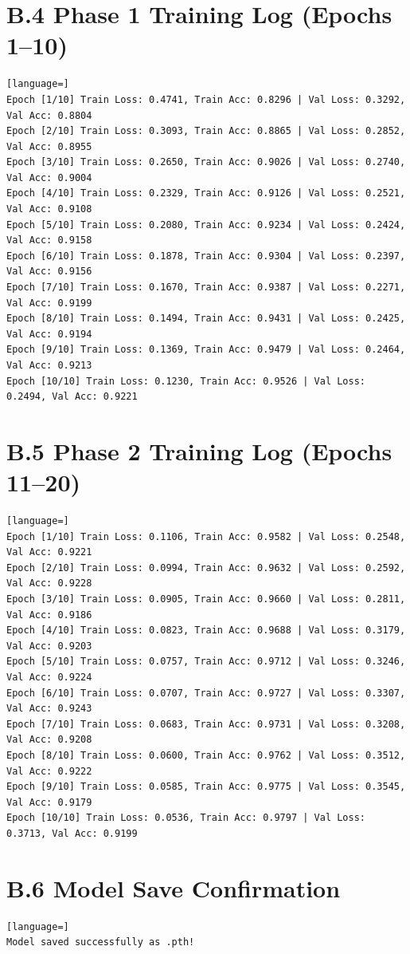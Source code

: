 \documentclass[12pt,a4paper]{report}
\begin{document}
\section*{B.4 Phase 1 Training Log (Epochs 1--10)}
\begin{lstlisting}[language=]
Epoch [1/10] Train Loss: 0.4741, Train Acc: 0.8296 | Val Loss: 0.3292, Val Acc: 0.8804
Epoch [2/10] Train Loss: 0.3093, Train Acc: 0.8865 | Val Loss: 0.2852, Val Acc: 0.8955
Epoch [3/10] Train Loss: 0.2650, Train Acc: 0.9026 | Val Loss: 0.2740, Val Acc: 0.9004
Epoch [4/10] Train Loss: 0.2329, Train Acc: 0.9126 | Val Loss: 0.2521, Val Acc: 0.9108
Epoch [5/10] Train Loss: 0.2080, Train Acc: 0.9234 | Val Loss: 0.2424, Val Acc: 0.9158
Epoch [6/10] Train Loss: 0.1878, Train Acc: 0.9304 | Val Loss: 0.2397, Val Acc: 0.9156
Epoch [7/10] Train Loss: 0.1670, Train Acc: 0.9387 | Val Loss: 0.2271, Val Acc: 0.9199
Epoch [8/10] Train Loss: 0.1494, Train Acc: 0.9431 | Val Loss: 0.2425, Val Acc: 0.9194
Epoch [9/10] Train Loss: 0.1369, Train Acc: 0.9479 | Val Loss: 0.2464, Val Acc: 0.9213
Epoch [10/10] Train Loss: 0.1230, Train Acc: 0.9526 | Val Loss: 0.2494, Val Acc: 0.9221
\end{lstlisting}

\section*{B.5 Phase 2 Training Log (Epochs 11--20)}
\begin{lstlisting}[language=]
Epoch [1/10] Train Loss: 0.1106, Train Acc: 0.9582 | Val Loss: 0.2548, Val Acc: 0.9221
Epoch [2/10] Train Loss: 0.0994, Train Acc: 0.9632 | Val Loss: 0.2592, Val Acc: 0.9228
Epoch [3/10] Train Loss: 0.0905, Train Acc: 0.9660 | Val Loss: 0.2811, Val Acc: 0.9186
Epoch [4/10] Train Loss: 0.0823, Train Acc: 0.9688 | Val Loss: 0.3179, Val Acc: 0.9203
Epoch [5/10] Train Loss: 0.0757, Train Acc: 0.9712 | Val Loss: 0.3246, Val Acc: 0.9224
Epoch [6/10] Train Loss: 0.0707, Train Acc: 0.9727 | Val Loss: 0.3307, Val Acc: 0.9243
Epoch [7/10] Train Loss: 0.0683, Train Acc: 0.9731 | Val Loss: 0.3208, Val Acc: 0.9208
Epoch [8/10] Train Loss: 0.0600, Train Acc: 0.9762 | Val Loss: 0.3512, Val Acc: 0.9222
Epoch [9/10] Train Loss: 0.0585, Train Acc: 0.9775 | Val Loss: 0.3545, Val Acc: 0.9179
Epoch [10/10] Train Loss: 0.0536, Train Acc: 0.9797 | Val Loss: 0.3713, Val Acc: 0.9199
\end{lstlisting}

\section*{B.6 Model Save Confirmation}
\begin{lstlisting}[language=]
Model saved successfully as .pth!
\end{lstlisting}
\end{document}
